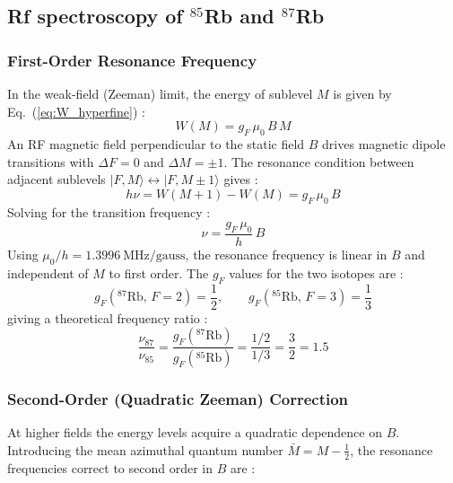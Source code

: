 \subsection{Rf spectroscopy of $^{85}$Rb and $^{87}$Rb }

\subsubsection*{First-Order Resonance Frequency}
 
In the weak-field (Zeeman) limit, the energy of sublevel $M$ is given by
Eq.~(\ref{eq:W_hyperfine}) :
\begin{equation}
    W(M) = g_F\,\mu_0\,B\,M
    \label{eq:RF_energy}
\end{equation}
An RF magnetic field perpendicular to the static field $B$ drives magnetic dipole
transitions with $\Delta F = 0$ and $\Delta M = \pm 1$. The resonance condition between
adjacent sublevels $|F, M\rangle \leftrightarrow |F, M\pm 1\rangle$ gives :
\begin{equation}
    h\nu = W(M+1) - W(M) = g_F\,\mu_0\,B
    \label{eq:RF_resonance}
\end{equation}
Solving for the transition frequency :
\begin{equation}
    \boxed{\nu = \frac{g_F\,\mu_0}{h}\,B}
    \label{eq:RF_freq}
\end{equation}
Using $\mu_0/h = 1.3996\ \text{MHz/gauss}$, the resonance frequency is linear in $B$
and independent of $M$ to first order. The $g_F$ values for the two isotopes are :
\begin{equation}
    g_F\!\left(^{87}\text{Rb},\,F=2\right) = \frac{1}{2},
    \qquad
    g_F\!\left(^{85}\text{Rb},\,F=3\right) = \frac{1}{3}
    \label{eq:gF_values}
\end{equation}
giving a theoretical frequency ratio :
\begin{equation}
    \frac{\nu_{87}}{\nu_{85}}
    = \frac{g_F(^{87}\text{Rb})}{g_F(^{85}\text{Rb})}
    = \frac{1/2}{1/3} = \frac{3}{2} = 1.5
    \label{eq:freq_ratio}
\end{equation}
 
\subsubsection*{Second-Order (Quadratic Zeeman) Correction}
 
At higher fields the energy levels acquire a quadratic dependence on $B$. Introducing
the mean azimuthal quantum number $\bar{M} = M - \tfrac{1}{2}$, the resonance
frequencies correct to second order in $B$ are :
 
